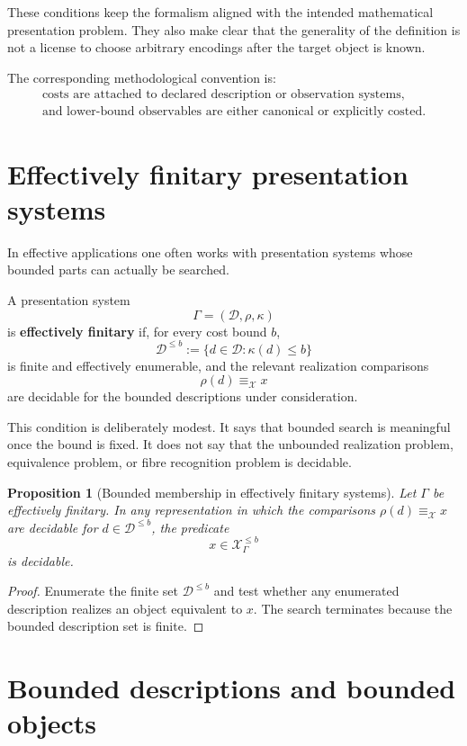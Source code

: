 \documentclass[11pt]{article}
\newtheorem{proposition}[theorem]{Proposition}
\begin{document}
These conditions keep the formalism aligned with the intended mathematical presentation problem. They also make clear that the generality of the definition is not a license to choose arbitrary encodings after the target object is known.

The corresponding methodological convention is:
\[
\begin{gathered}
\text{costs are attached to declared description or observation systems,}\\
\text{and lower-bound observables are either canonical or explicitly costed.}
\end{gathered}
\]

\section{Effectively finitary presentation systems}

In effective applications one often works with presentation systems whose bounded parts can actually be searched.

A presentation system
\[
\Gamma=(\mathcal D,\rho,\kappa)
\]
is \textbf{effectively finitary} if, for every cost bound \(b\),
\[
\mathcal D^{\leq b}:=\{d\in\mathcal D:\kappa(d)\leq b\}
\]
is finite and effectively enumerable, and the relevant realization comparisons
\[
\rho(d)\equiv_\mathcal X x
\]
are decidable for the bounded descriptions under consideration.

This condition is deliberately modest. It says that bounded search is meaningful once the bound is fixed. It does not say that the unbounded realization problem, equivalence problem, or fibre recognition problem is decidable.

\begin{proposition}[Bounded membership in effectively finitary systems]
Let \(\Gamma\) be effectively finitary. In any representation in which the comparisons \(\rho(d)\equiv_\mathcal X x\) are decidable for \(d\in\mathcal D^{\leq b}\), the predicate
\[
x\in\mathcal X_\Gamma^{\leq b}
\]
is decidable.
\end{proposition}

\begin{proof}
Enumerate the finite set \(\mathcal D^{\leq b}\) and test whether any enumerated description realizes an object equivalent to \(x\). The search terminates because the bounded description set is finite.
\end{proof}


\section{Bounded descriptions and bounded objects}
\end{document}

